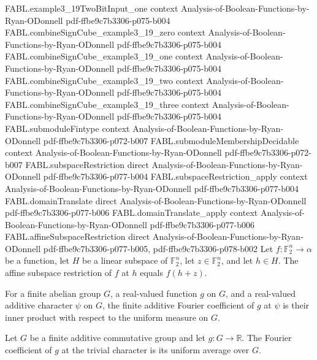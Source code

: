 \begin{theorem}
\proofstep
  {FABL.example3_19TwoBitInput_one}
  {context}
  {Analysis-of-Boolean-Functions-by-Ryan-ODonnell}
  {pdf-ffbe9c7b3306-p075-b004}
\proofstep
  {FABL.combineSignCube_example3_19_zero}
  {context}
  {Analysis-of-Boolean-Functions-by-Ryan-ODonnell}
  {pdf-ffbe9c7b3306-p075-b004}
\proofstep
  {FABL.combineSignCube_example3_19_one}
  {context}
  {Analysis-of-Boolean-Functions-by-Ryan-ODonnell}
  {pdf-ffbe9c7b3306-p075-b004}
\proofstep
  {FABL.combineSignCube_example3_19_two}
  {context}
  {Analysis-of-Boolean-Functions-by-Ryan-ODonnell}
  {pdf-ffbe9c7b3306-p075-b004}
\proofstep
  {FABL.combineSignCube_example3_19_three}
  {context}
  {Analysis-of-Boolean-Functions-by-Ryan-ODonnell}
  {pdf-ffbe9c7b3306-p075-b004}
\proofstep
  {FABL.submoduleFintype}
  {context}
  {Analysis-of-Boolean-Functions-by-Ryan-ODonnell}
  {pdf-ffbe9c7b3306-p072-b007}
\proofstep
  {FABL.submoduleMembershipDecidable}
  {context}
  {Analysis-of-Boolean-Functions-by-Ryan-ODonnell}
  {pdf-ffbe9c7b3306-p072-b007}
\proofstep
  {FABL.subspaceRestriction}
  {direct}
  {Analysis-of-Boolean-Functions-by-Ryan-ODonnell}
  {pdf-ffbe9c7b3306-p077-b004}
\proofstep
  {FABL.subspaceRestriction_apply}
  {context}
  {Analysis-of-Boolean-Functions-by-Ryan-ODonnell}
  {pdf-ffbe9c7b3306-p077-b004}
\proofstep
  {FABL.domainTranslate}
  {direct}
  {Analysis-of-Boolean-Functions-by-Ryan-ODonnell}
  {pdf-ffbe9c7b3306-p077-b006}
\proofstep
  {FABL.domainTranslate_apply}
  {context}
  {Analysis-of-Boolean-Functions-by-Ryan-ODonnell}
  {pdf-ffbe9c7b3306-p077-b006}
\proofstep
  {FABL.affineSubspaceRestriction}
  {direct}
  {Analysis-of-Boolean-Functions-by-Ryan-ODonnell}
  {pdf-ffbe9c7b3306-p077-b005,
    pdf-ffbe9c7b3306-p078-b002}
Let $f:\mathbb F_2^n\to\alpha$ be a function, let $H$ be a linear subspace of $\mathbb
F_2^n$, let $z\in\mathbb F_2^n$, and let $h\in H$. The affine subspace restriction of
$f$ at $h$ equals $f(h+z)$.
\end{theorem}

\begin{definition}
\label{FABL.finiteAddFourierCoeff}
\leanok
{}
For a finite abelian group $G$, a real-valued function $g$ on $G$, and a real-valued
additive character $\psi$ on $G$, the finite additive Fourier coefficient of $g$ at
$\psi$ is their inner product with respect to the uniform measure on $G$.
\end{definition}

\begin{theorem}
\label{FABL.finiteAddFourierCoeff_zero_eq_expect}
\leanok
{}
Let $G$ be a finite additive commutative group and let $g:G\to\mathbb{R}$. The Fourier
coefficient of $g$ at the trivial character is its uniform average over $G$.
\end{theorem}

